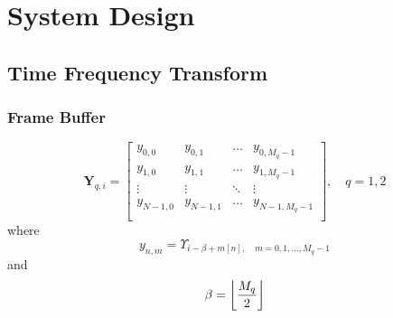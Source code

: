 \chapter{System Design}

\section{Time Frequency Transform}

\subsection{Frame Buffer}

\begin{equation}
\mathbf{Y}_{q,i} = 
\begin{bmatrix}
y_{0,0}       & y_{0,1}  & \dotsc & y_{0,M_q -1 }\\
y_{1,0}       & y_{1,1}  & \dotsc & y_{1,M_q -1} \\
\vdots        & \vdots   & \ddots & \vdots \\
y_{N-1,0}     & y_{N-1,1}& \dotsc & y_{N-1,M_q-1} \\
\end{bmatrix},\quad q = 1,2
\end{equation}
where
\begin{equation}
y_{n,m} = \Upsilon_{i-\beta+m[n], \quad  m=0,1,...,M_q-1}
\end{equation}
and
\begin{equation}
\beta = \floor*{\frac{M_q}{2}}
\end{equation}